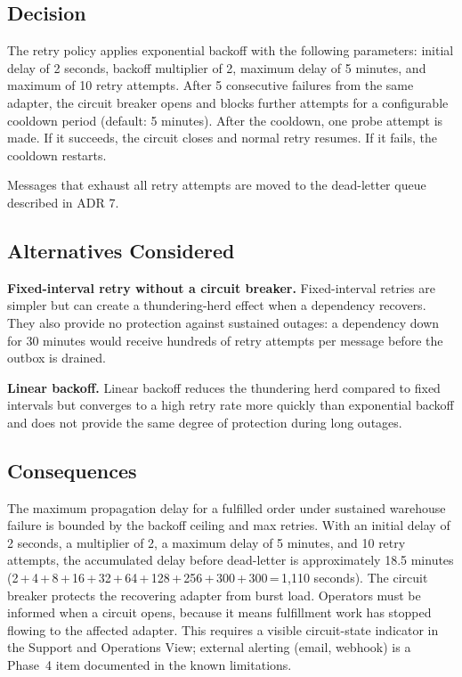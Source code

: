 \subsection{Decision}

The retry policy applies exponential backoff with the following parameters: initial delay of
2 seconds, backoff multiplier of 2, maximum delay of 5 minutes, and maximum of 10 retry
attempts. After 5 consecutive failures from the same adapter, the circuit breaker opens and
blocks further attempts for a configurable cooldown period (default: 5 minutes). After the
cooldown, one probe attempt is made. If it succeeds, the circuit closes and normal retry
resumes. If it fails, the cooldown restarts.

Messages that exhaust all retry attempts are moved to the dead-letter queue described in
ADR 7.

\subsection{Alternatives Considered}

\textbf{Fixed-interval retry without a circuit breaker.} Fixed-interval retries are simpler but
can create a thundering-herd effect when a dependency recovers. They also provide no protection
against sustained outages: a dependency down for 30 minutes would receive hundreds of retry
attempts per message before the outbox is drained.

\textbf{Linear backoff.} Linear backoff reduces the thundering herd compared to fixed intervals
but converges to a high retry rate more quickly than exponential backoff and does not provide
the same degree of protection during long outages.

\subsection{Consequences}

The maximum propagation delay for a fulfilled order under sustained warehouse failure is bounded
by the backoff ceiling and max retries. With an initial delay of 2 seconds, a multiplier of 2,
a maximum delay of 5 minutes, and 10 retry attempts, the accumulated delay before dead-letter
is approximately 18.5 minutes (2\,+\,4\,+\,8\,+\,16\,+\,32\,+\,64\,+\,128\,+\,256\,+\,300\,+\,300\,=\,1{,}110 seconds).
The circuit breaker protects the recovering adapter from burst load. Operators
must be informed when a circuit opens, because it means fulfillment work has stopped flowing
to the affected adapter. This requires a visible circuit-state indicator in the Support and
Operations View; external alerting (email, webhook) is a Phase~4 item documented in the
known limitations.

